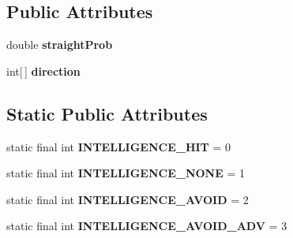 \subsection*{Public Attributes}
\begin{DoxyCompactItemize}
\item 
\hypertarget{classdev_1_1boxy_1_1fortyfive_1_1core_1_1movement_1_1_intelligent_movement_a6c300c2bfc9db3415142c155428de0d9}{
double {\bfseries straightProb}}
\label{d7/d04/classdev_1_1boxy_1_1fortyfive_1_1core_1_1movement_1_1_intelligent_movement_a6c300c2bfc9db3415142c155428de0d9}

\item 
\hypertarget{classdev_1_1boxy_1_1fortyfive_1_1core_1_1movement_1_1_intelligent_movement_ac136ae17279a7ac26c5676043390288a}{
int\mbox{[}$\,$\mbox{]} {\bfseries direction}}
\label{d7/d04/classdev_1_1boxy_1_1fortyfive_1_1core_1_1movement_1_1_intelligent_movement_ac136ae17279a7ac26c5676043390288a}

\end{DoxyCompactItemize}
\subsection*{Static Public Attributes}
\begin{DoxyCompactItemize}
\item 
\hypertarget{classdev_1_1boxy_1_1fortyfive_1_1core_1_1movement_1_1_intelligent_movement_ad22f6268554d7a6a01affb542486e852}{
static final int {\bfseries INTELLIGENCE\_\-HIT} = 0}
\label{d7/d04/classdev_1_1boxy_1_1fortyfive_1_1core_1_1movement_1_1_intelligent_movement_ad22f6268554d7a6a01affb542486e852}

\item 
\hypertarget{classdev_1_1boxy_1_1fortyfive_1_1core_1_1movement_1_1_intelligent_movement_a21bba782b09a84a97d67d233a8b4b2c9}{
static final int {\bfseries INTELLIGENCE\_\-NONE} = 1}
\label{d7/d04/classdev_1_1boxy_1_1fortyfive_1_1core_1_1movement_1_1_intelligent_movement_a21bba782b09a84a97d67d233a8b4b2c9}

\item 
\hypertarget{classdev_1_1boxy_1_1fortyfive_1_1core_1_1movement_1_1_intelligent_movement_a1b05ce37825828c7bd670cabfa67556c}{
static final int {\bfseries INTELLIGENCE\_\-AVOID} = 2}
\label{d7/d04/classdev_1_1boxy_1_1fortyfive_1_1core_1_1movement_1_1_intelligent_movement_a1b05ce37825828c7bd670cabfa67556c}

\item 
\hypertarget{classdev_1_1boxy_1_1fortyfive_1_1core_1_1movement_1_1_intelligent_movement_a0379aebd9ed41d78760d9ea4461b3060}{
static final int {\bfseries INTELLIGENCE\_\-AVOID\_\-ADV} = 3}
\label{d7/d04/classdev_1_1boxy_1_1fortyfive_1_1core_1_1movement_1_1_intelligent_movement_a0379aebd9ed41d78760d9ea4461b3060}

\end{DoxyCompactItemize}
